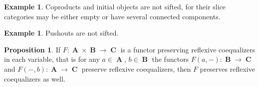\documentclass[a4paper,11pt,fullpage,oneside,openany]{amsbook}
\DeclareMathOperator{\A}{\mathbf{A}}
\DeclareMathOperator{\B}{\mathbf{B}}
\DeclareMathOperator{\C}{\mathbf{C}}
\theoremstyle{definition}
\theoremstyle{definition}
\newtheorem{exmp}[thm]{Example} %
\newtheorem{prop}[thm]{Proposition}
\theoremstyle{remark}
\begin{document}
\begin{exmp}
	Coproducts and initial objects are not sifted, for their slice categories may be either empty or have several connected components.
\end{exmp}

\begin{exmp}
	Pushouts are not sifted.
\end{exmp}

\begin{prop}
	If $F\colon\A\times\B\rightarrow\C$ is a functor preserving reflexive coequalizers in each variable, that is for any $a\in\A$, $b\in\B$ the functors $F(a,-)\colon\B\rightarrow\C$ and $F(-,b)\colon\A\rightarrow\C$ preserve reflexive coequalizers, then $F$ preserves reflexive coequalizers as well.
\end{prop}
\end{document}

